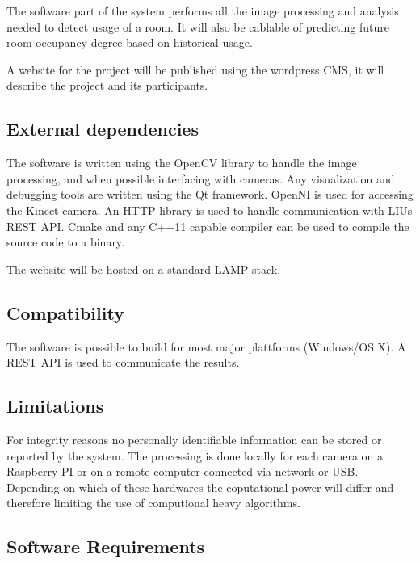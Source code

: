 The software part of the system performs all the image processing and analysis needed to detect usage of a room. It will also be cablable of predicting future room occupancy degree based on historical usage. 

A website for the project will be published using the wordpress CMS, it will describe the project and its participants.
 
\subsection{External dependencies}
The software is written using the OpenCV library to handle the image processing, and when possible interfacing with cameras. 
Any visualization and debugging tools are written using the Qt framework. 
OpenNI is used for accessing the Kinect camera. 
An HTTP library is used to handle communication with LIUs REST API.
Cmake and any C++11 capable compiler can be used to compile the source code to a binary.

The website will be hosted on a standard LAMP stack.

\subsection{Compatibility}
The software is possible to build for most major plattforms (Windows/OS X). A REST API is used to communicate the results.

\subsection{Limitations}
For integrity reasons no personally identifiable information can be stored or reported by the system. The processing is done locally for each camera on a Raspberry PI or on a remote computer connected via network or USB. Depending on which of these hardwares the coputational power will differ and therefore limiting the use of computional heavy algorithms.  

\subsection{Software Requirements}
\label{sec:software_req}
\reqtable
{	
}